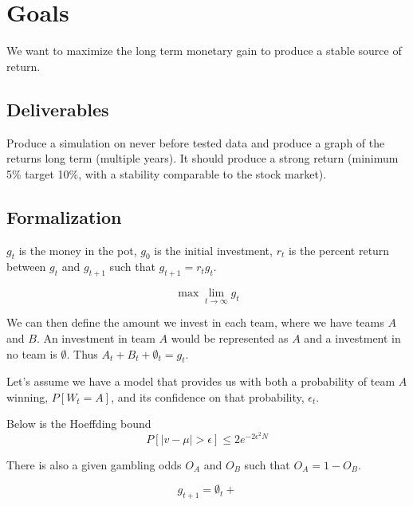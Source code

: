 \documentclass{article}
\begin{document}
\iffalse
\section*{REMOVE / TODO}
\begin{enumerate}
    \item Find how to use epsilon to calculate return
    \item How do betting odds work in terms of mon
\end{enumerate}
\fi

\section*{Goals}
    We want to maximize the long term monetary gain to produce a stable source of return.
    \subsection*{Deliverables}
    Produce a simulation on never before tested data and produce a graph of the returns long term (multiple years).
    It should produce a strong return (minimum 5\% target 10\%, with a stability comparable to the stock market).

    \subsection*{Formalization}
    $g_t$ is the money in the pot, $g_0$ is the initial investment, $r_t$ is the percent return between $g_t$ and $g_{t+1}$ such that $g_{t+1} = r_tg_t$.

    $$\max{\lim_{t \to \infty} g_t}$$

    We can then define the amount we invest in each team, where we have teams $A$ and $B$.
    An investment in team $A$ would be represented as $A$ and a investment in no team is $\emptyset$.
    Thus $A_t + B_t + \emptyset_t = g_t$.

    Let's assume we have a model that provides us with both a probability of team $A$ winning, $P[W_t = A]$, and its confidence on that probability, $\epsilon_t$.

    Below is the Hoeffding bound
    $$P[|v - \mu| > \epsilon] \leq 2e^{-2\epsilon^2N} $$

    There is also a given gambling odds $O_A$ and $O_B$ such that $O_A = 1 - O_B$.

    $$g_{t+1} = \emptyset_t +  $$
\end{document}
